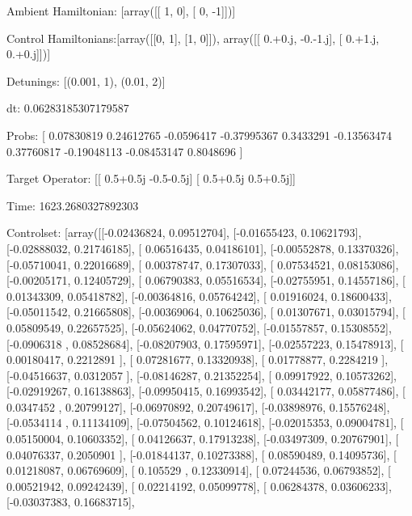 \documentclass{article}
\begin{document}
    

\newpage

Ambient Hamiltonian: [array([[ 1,  0],
       [ 0, -1]])]

Control Hamiltonians:[array([[0, 1],
       [1, 0]]), array([[ 0.+0.j, -0.-1.j],
       [ 0.+1.j,  0.+0.j]])]

Detunings: [(0.001, 1), (0.01, 2)]

 dt: 0.06283185307179587

Probs: [ 0.07830819  0.24612765 -0.0596417  -0.37995367  0.3433291  -0.13563474
  0.37760817 -0.19048113 -0.08453147  0.8048696 ]

Target Operator: [[ 0.5+0.5j -0.5-0.5j]
 [ 0.5+0.5j  0.5+0.5j]]

Time: 1623.2680327892303

Controlset: [array([[-0.02436824,  0.09512704],
       [-0.01655423,  0.10621793],
       [-0.02888032,  0.21746185],
       [ 0.06516435,  0.04186101],
       [-0.00552878,  0.13370326],
       [-0.05710041,  0.22016689],
       [ 0.00378747,  0.17307033],
       [ 0.07534521,  0.08153086],
       [-0.00205171,  0.12405729],
       [ 0.06790383,  0.05516534],
       [-0.02755951,  0.14557186],
       [ 0.01343309,  0.05418782],
       [-0.00364816,  0.05764242],
       [ 0.01916024,  0.18600433],
       [-0.05011542,  0.21665808],
       [-0.00369064,  0.10625036],
       [ 0.01307671,  0.03015794],
       [ 0.05809549,  0.22657525],
       [-0.05624062,  0.04770752],
       [-0.01557857,  0.15308552],
       [-0.0906318 ,  0.08528684],
       [-0.08207903,  0.17595971],
       [-0.02557223,  0.15478913],
       [ 0.00180417,  0.2212891 ],
       [ 0.07281677,  0.13320938],
       [ 0.01778877,  0.2284219 ],
       [-0.04516637,  0.0312057 ],
       [-0.08146287,  0.21352254],
       [ 0.09917922,  0.10573262],
       [-0.02919267,  0.16138863],
       [-0.09950415,  0.16993542],
       [ 0.03442177,  0.05877486],
       [ 0.0347452 ,  0.20799127],
       [-0.06970892,  0.20749617],
       [-0.03898976,  0.15576248],
       [-0.0534114 ,  0.11134109],
       [-0.07504562,  0.10124618],
       [-0.02015353,  0.09004781],
       [ 0.05150004,  0.10603352],
       [ 0.04126637,  0.17913238],
       [-0.03497309,  0.20767901],
       [ 0.04076337,  0.2050901 ],
       [-0.01844137,  0.10273388],
       [ 0.08590489,  0.14095736],
       [ 0.01218087,  0.06769609],
       [ 0.105529  ,  0.12330914],
       [ 0.07244536,  0.06793852],
       [ 0.00521942,  0.09242439],
       [ 0.02214192,  0.05099778],
       [ 0.06284378,  0.03606233],
       [-0.03037383,  0.16683715],
\end{document}
